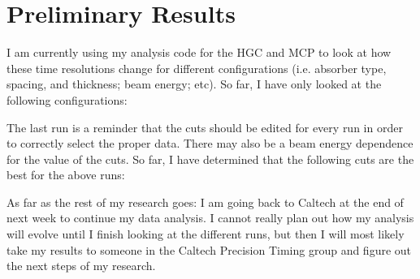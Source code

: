 \documentclass[12pt]{article}
\begin{document}
\begin{figure}
\begin{minipage}[t]{.49\textwidth}
\end{minipage}
\end{figure}


\setcounter{section}{3}
\section{Preliminary Results}
I am currently using my analysis code for the HGC and MCP to look at how these time resolutions change for different configurations (i.e. absorber type, spacing, and thickness; beam energy; etc). 
So far, I have only looked at the following configurations:


The last run is a reminder that the cuts should be edited for every run in order to correctly select the proper data. 
There may also be a beam energy dependence for the value of the cuts. 
So far, I have determined that the following cuts are the best for the above runs:


As far as the rest of my research goes: I am going back to Caltech at the end of next week to continue my data analysis. 
I cannot really plan out how my analysis will evolve until I finish looking at the different runs, but then I will most likely take my results to someone in the Caltech Precision Timing group and figure out the next steps of my research. 
\end{document}
